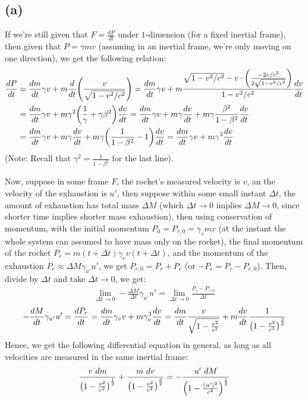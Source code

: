 \documentclass{article}
\DeclarePairedDelimiter{\paran}{(}{)}%
\begin{document}
\subsection*{(a)}
If we're still given that $F = \frac{dP}{dt}$ under $1$-dimension (for a fixed inertial frame), then given that $P = \gamma mv$ (assuming in an inertial frame, we're only moving on one direction), we get the following relation: 
\begin{align}
    \frac{dP}{dt} &= \frac{dm}{dt} \gamma v + m \frac{d}{dt}\paran*{\frac{v}{\sqrt{1-v^2/c^2}}} = \frac{dm}{dt}\gamma v + m\frac{\sqrt{1-v^2/c^2} - v\cdot \paran*{\frac{-2v/c^2}{2\sqrt{1-v^2/c^2}}}}{1-v^2/c^2}\frac{dv}{dt}\\
    &= \frac{dm}{dt}\gamma v + m\gamma^2\paran*{\frac{1}{\gamma}+\gamma\beta^2}\frac{dv}{dt} = \frac{dm}{dt}\gamma v + m\gamma\frac{dv}{dt}+m\gamma \frac{\beta^2}{1-\beta^2}\frac{dv}{dt}\\
    &= \frac{dm}{dt}\gamma v+m\gamma\frac{dv}{dt} + m\gamma\paran*{\frac{1}{1-\beta^2}-1}\frac{dv}{dt} = \frac{dm}{dt}\gamma v + m\gamma^3\frac{dv}{dt}
\end{align}
(Note: Recall that $\gamma^2 = \frac{1}{1-\beta^2}$ for the last line).

Now, suppose in some frame $F$, the rocket's measured velocity is $v$, an the velocity of the exhaustion is $u'$, then suppose within some small instant $\Delta t$, the amount of exhaustion has total mass $\Delta M$ (which $\Delta t\rightarrow 0$ implies $\Delta M\rightarrow 0$, since shorter time implies shorter mass exhaustion), then using conservation of momentum, with the initial momentum $P_0 = P_{r,0} = \gamma_v mv$ (at the instant the whole system can assumed to have mass only on the rocket), the final momentum of the rocket $P_r = m(t+\Delta t) \gamma_v v(t+\Delta t)$, and the momentum of the exhaustion $P_e \approx \Delta M \gamma_{u'}u'$, we get $P_{r,0} = P_r+P_e$ (or $-P_e = P_r - P_{r,0}$). Then, divide by $\Delta t$ and take $\Delta t\rightarrow 0$, we get:
\begin{align}
    \lim_{\Delta t\rightarrow 0}-\frac{\Delta M}{\Delta t}\gamma_{u'}u' = \lim_{\Delta t\rightarrow 0}\frac{P_r - P_{r,0}}{\Delta t}
\end{align}
\begin{align}
    -\frac{dM}{dt}\gamma_{u'}u'= \frac{dP_r}{dt} = \frac{dm}{dt}\gamma_v v+m\gamma_v^3 \frac{dv}{dt} = \frac{dm}{dt}\frac{v}{\sqrt{1-\frac{v^2}{c^2}}} + m\frac{dv}{dt}\frac{1}{\paran*{1-\frac{v^2}{c^2}}^\frac{3}{2}}
\end{align}
Hence, we get the following differential equation in general, as long as all velocities are measured in the same inertial frame:
\begin{align}
    \frac{v\ dm}{\paran*{1-\frac{v^2}{c^2}}^\frac{1}{2}} + \frac{m\ dv}{\paran*{1-\frac{v^2}{c^2}}^\frac{3}{2}} = -\frac{u'\ dM}{\paran*{1-\frac{(u')^2}{c^2}}^\frac{1}{2}}
\end{align}
\end{document}
